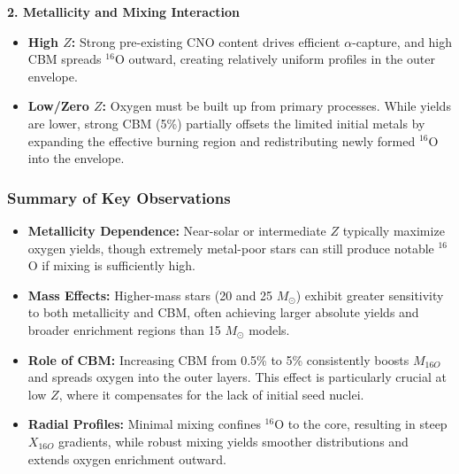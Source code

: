 \vspace{1em}
\textbf{2. Metallicity and Mixing Interaction}
\begin{itemize}
    \item \textbf{High $Z$:}
    Strong pre-existing CNO content drives efficient $\alpha$-capture, and high CBM spreads $^{16}$O outward, creating relatively uniform profiles in the outer envelope.
    \item \textbf{Low/Zero $Z$:}
    Oxygen must be built up from primary processes. While yields are lower, strong CBM (5\%) partially offsets the limited initial metals by expanding the effective burning region and redistributing newly formed $^{16}$O into the envelope.
\end{itemize}

\subsubsection{Summary of Key Observations}

\begin{itemize}
    \item \textbf{Metallicity Dependence:}
    Near-solar or intermediate $Z$ typically maximize oxygen yields, though extremely metal-poor stars can still produce notable $^{16}$O if mixing is sufficiently high.
    \item \textbf{Mass Effects:}
    Higher-mass stars (20 and 25 $M_\odot$) exhibit greater sensitivity to both metallicity and CBM, often achieving larger absolute yields and broader enrichment regions than 15 $M_\odot$ models.
    \item \textbf{Role of CBM:}
    Increasing CBM from 0.5\% to 5\% consistently boosts $M_{16O}$ and spreads oxygen into the outer layers. This effect is particularly crucial at low $Z$, where it compensates for the lack of initial seed nuclei.
    \item \textbf{Radial Profiles:}
    Minimal mixing confines $^{16}$O to the core, resulting in steep $X_{16O}$ gradients, while robust mixing yields smoother distributions and extends oxygen enrichment outward.
\end{itemize}


